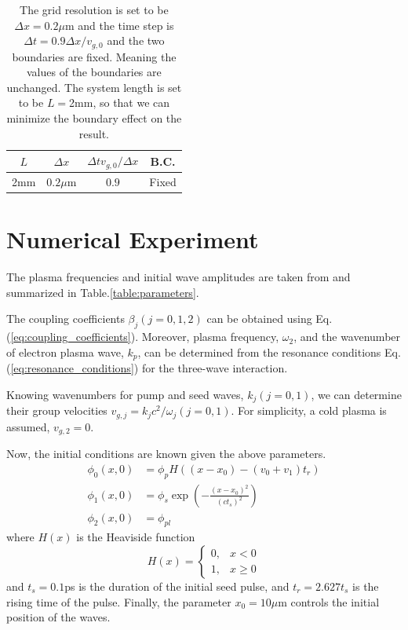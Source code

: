 \documentclass{article}
\begin{document}
    \begin{table} 
        \centering
        \caption{The grid resolution is set to be $\Delta x=0.2\mu$m and the time step is $\Delta t = 0.9\Delta x/v_{g,0}$ and the two boundaries are fixed. Meaning the values of the boundaries are unchanged. The system length is set to be $L=$2mm, so that we can minimize the boundary effect on the result. }
        \begin{tabular}{|c|c|c||c|}
            \hline
            $L$ & $\Delta x$ & $\Delta t v_{g,0}/\Delta x$ & B.C.  \\
            \hline
            2mm & $0.2\mu$m & $0.9$ & Fixed  \\
            \hline
        \end{tabular}
        \label{table:simulation_parameters}
    \end{table}

    \section{Numerical Experiment}
    The plasma frequencies and initial wave amplitudes are taken from \cite{kim_machine_2019} and summarized in Table.\ref{table:parameters}. 

    The coupling coefficients $\beta_j (j=0,1,2)$ can be obtained using Eq.(\ref{eq:coupling_coefficients}). Moreover, plasma frequency, $\omega_2$, and the wavenumber of electron plasma wave, $k_p$, can be determined from the resonance conditions Eq.(\ref{eq:resonance_conditions}) for the three-wave interaction. 
    
    Knowing wavenumbers for pump and seed waves, $k_j (j=0,1)$, we can determine their group velocities $v_{g,j} = k_jc^2/\omega_j (j=0,1)$. For simplicity, a cold plasma is assumed, $v_{g,2}=0$.

    Now, the initial conditions are known given the above parameters.
    \begin{equation}
        \begin{aligned}
            \phi_0(x,0) &= \phi_p H((x-x_0) - (v_0+v_1)t_r) \\
            \phi_1(x,0) &= \phi_s \exp(-\frac{(x-x_0)^2}{(ct_s)^2}) \\
            \phi_2(x,0) &= \phi_{pl} 
        \end{aligned}
    \end{equation}
    where $H(x)$ is the Heaviside function
    \[ H(x) = \begin{cases}
        0, &x<0 \\
        1, &x\geq 0
    \end{cases} \]
    and $t_s=0.1$ps is the duration of the initial seed pulse, and $t_r=2.627t_s$ is the rising time of the pulse. Finally, the parameter $x_0=10\mu$m controls the initial position of the waves.
\end{document}
